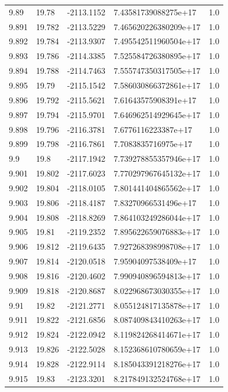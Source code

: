 \begin{tabular}{lllll}
9.89 & 19.78 & -2113.1152 & 7.43581739088275e+17 & 1.0 \\
9.891 & 19.782 & -2113.5229 & 7.465620226380209e+17 & 1.0 \\
9.892 & 19.784 & -2113.9307 & 7.495542511960504e+17 & 1.0 \\
9.893 & 19.786 & -2114.3385 & 7.525584726380895e+17 & 1.0 \\
9.894 & 19.788 & -2114.7463 & 7.555747350317505e+17 & 1.0 \\
9.895 & 19.79 & -2115.1542 & 7.586030866372861e+17 & 1.0 \\
9.896 & 19.792 & -2115.5621 & 7.61643575908391e+17 & 1.0 \\
9.897 & 19.794 & -2115.9701 & 7.646962514929645e+17 & 1.0 \\
9.898 & 19.796 & -2116.3781 & 7.6776116223387e+17 & 1.0 \\
9.899 & 19.798 & -2116.7861 & 7.7083835716975e+17 & 1.0 \\
9.9 & 19.8 & -2117.1942 & 7.739278855357946e+17 & 1.0 \\
9.901 & 19.802 & -2117.6023 & 7.770297967645132e+17 & 1.0 \\
9.902 & 19.804 & -2118.0105 & 7.801441404865562e+17 & 1.0 \\
9.903 & 19.806 & -2118.4187 & 7.83270966531496e+17 & 1.0 \\
9.904 & 19.808 & -2118.8269 & 7.864103249286044e+17 & 1.0 \\
9.905 & 19.81 & -2119.2352 & 7.895622659076883e+17 & 1.0 \\
9.906 & 19.812 & -2119.6435 & 7.927268398998708e+17 & 1.0 \\
9.907 & 19.814 & -2120.0518 & 7.95904097538409e+17 & 1.0 \\
9.908 & 19.816 & -2120.4602 & 7.990940896594813e+17 & 1.0 \\
9.909 & 19.818 & -2120.8687 & 8.022968673030355e+17 & 1.0 \\
9.91 & 19.82 & -2121.2771 & 8.055124817135878e+17 & 1.0 \\
9.911 & 19.822 & -2121.6856 & 8.087409843410263e+17 & 1.0 \\
9.912 & 19.824 & -2122.0942 & 8.119824268414671e+17 & 1.0 \\
9.913 & 19.826 & -2122.5028 & 8.152368610780659e+17 & 1.0 \\
9.914 & 19.828 & -2122.9114 & 8.185043391218276e+17 & 1.0 \\
9.915 & 19.83 & -2123.3201 & 8.217849132524768e+17 & 1.0 \\

\end{tabular}
